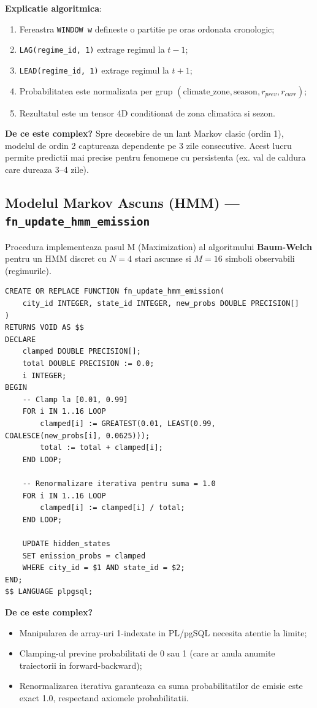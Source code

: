 \documentclass[12pt,a4paper]{article}
\begin{document}
\textbf{Explicatie algoritmica}:
\begin{enumerate}
    \item Fereastra \texttt{WINDOW w} defineste o partitie pe oras ordonata cronologic;
    \item \texttt{LAG(regime\_id, 1)} extrage regimul la $t-1$;
    \item \texttt{LEAD(regime\_id, 1)} extrage regimul la $t+1$;
    \item Probabilitatea este normalizata per grup $(\text{climate\_zone}, \text{season}, r_{prev}, r_{curr})$;
    \item Rezultatul este un tensor 4D conditionat de zona climatica si sezon.
\end{enumerate}

\textbf{De ce este complex?} Spre deosebire de un lant Markov clasic (ordin 1), modelul de ordin 2 captureaza dependente pe 3 zile consecutive. Acest lucru permite predictii mai precise pentru fenomene cu persistenta (ex. val de caldura care dureaza 3--4 zile).

\subsection{Modelul Markov Ascuns (HMM) --- \texttt{fn\_update\_hmm\_emission}}

Procedura implementeaza pasul M (Maximization) al algoritmului \textbf{Baum-Welch} pentru un HMM discret cu $N = 4$ stari ascunse si $M = 16$ simboli observabili (regimurile).

\begin{lstlisting}[caption={Normalizarea probabilitatilor de emisie in HMM}]
CREATE OR REPLACE FUNCTION fn_update_hmm_emission(
    city_id INTEGER, state_id INTEGER, new_probs DOUBLE PRECISION[]
)
RETURNS VOID AS $$
DECLARE
    clamped DOUBLE PRECISION[];
    total DOUBLE PRECISION := 0.0;
    i INTEGER;
BEGIN
    -- Clamp la [0.01, 0.99]
    FOR i IN 1..16 LOOP
        clamped[i] := GREATEST(0.01, LEAST(0.99, COALESCE(new_probs[i], 0.0625)));
        total := total + clamped[i];
    END LOOP;

    -- Renormalizare iterativa pentru suma = 1.0
    FOR i IN 1..16 LOOP
        clamped[i] := clamped[i] / total;
    END LOOP;

    UPDATE hidden_states
    SET emission_probs = clamped
    WHERE city_id = $1 AND state_id = $2;
END;
$$ LANGUAGE plpgsql;
\end{lstlisting}

\textbf{De ce este complex?}
\begin{itemize}
    \item Manipularea de array-uri 1-indexate in PL/pgSQL necesita atentie la limite;
    \item Clamping-ul previne probabilitati de 0 sau 1 (care ar anula anumite traiectorii in forward-backward);
    \item Renormalizarea iterativa garanteaza ca suma probabilitatilor de emisie este exact 1.0, respectand axiomele probabilitatii.
\end{itemize}
\end{document}
